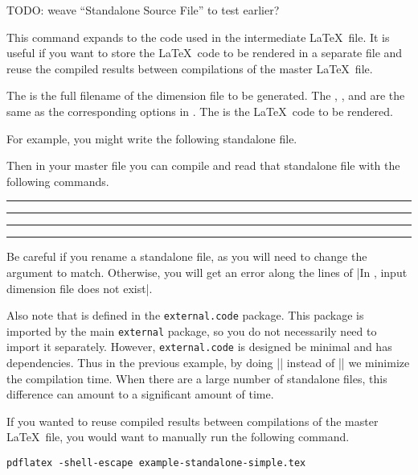 \documentclass[10pt]{ltxdoc}
\newcommand{\pkg}[1]{\texttt{#1}}
\newcommand{\showfile}[1]{
  \begin{tcolorbox}[title=\texttt{#1}]
  
  \end{tcolorbox}
}
\def\gauge{%
  \rule{0.2em}{7pt}%
  \llap{\rule[8pt]{0.2em}{2pt}}%
}
\begin{document}

TODO: weave ``Standalone Source File'' to test earlier?

This command expands to the code used in the intermediate \LaTeX\ file.
It is useful if you want to store the \LaTeX\ code to be rendered in a
separate file and reuse the compiled results between compilations
of the master \LaTeX\ file.

The  is the full filename of the dimension file to
be generated.
The , , and  are the
same as the corresponding options in .
The  is the \LaTeX\ code to be rendered.

For example, you might write the following standalone file.

\showfile{example-standalone-simple.tex}

Then in your master file you can compile and read that standalone file
with the following commands.

\begin{tcblisting}{}
\gauge\ExternalCompile[file=example-standalone-simple]\gauge

\gauge\ExternalRead[file=example-standalone-simple]\gauge
\end{tcblisting}

Be careful if you rename a standalone file, as you will need to change
the  argument to match.
Otherwise, you will get an error along the lines of
|In \ExternalRead, input dimension file does not exist|.

Also note that  is defined in the \pkg{external.code}
package.
This package is imported by the main \pkg{external} package, so you do
not necessarily need to import it separately.
However, \pkg{external.code} is designed be minimal and has
dependencies.
Thus in the previous example, by doing |\RequirePackage{external.code}|
instead of |\RequirePackage{external}| we minimize the compilation
time.
When there are a large number of standalone files, this difference can
amount to a significant amount of time.

If you wanted to reuse compiled results between compilations of the
master \LaTeX\ file, you would want to manually run the following
command.

\begin{tcolorbox}
\begin{verbatim}
pdflatex -shell-escape example-standalone-simple.tex
\end{verbatim}
\end{tcolorbox}
\end{document}
